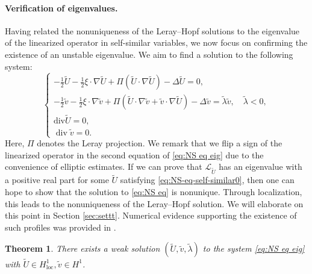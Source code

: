 \documentclass[11pt,a4paper]{article}
\numberwithin{equation}{section}
\newcommand{\cdummy}{\cdot}
\newcommand{\tmop}[1]{\ensuremath{\operatorname{#1}}}
\newtheorem{theorem}{Theorem}
\begin{document}
\paragraph{Verification of eigenvalues.}
Having related the nonuniqueness of the Leray--Hopf solutions to the eigenvalue of the linearized operator in self-similar variables, we now focus on confirming the existence of an unstable eigenvalue. We aim to find a solution to the following system:
\begin{equation}
  \left\{\begin{array}{l}
    - \frac{1}{2}  \widetilde{U} - \frac{1}{2} \xi \cdummy \nabla \widetilde{U} + \Pi
    (\widetilde{U} \cdot \nabla \widetilde{U}) - \Delta \widetilde{U} = 0,\\
    - \frac{1}{2}  \widetilde{v} - \frac{1}{2} \xi \cdummy \nabla \widetilde{v} + \Pi
    (\widetilde{U} \cdot \nabla \widetilde{v} + \widetilde{v} \cdot \nabla \widetilde{U}) -
    \Delta \widetilde{v} = \widetilde\lambda \widetilde{v}, \quad \widetilde\lambda < 0,\\
    \mathrm{div}  \widetilde{U} = 0,\\
    \tmop{div} \widetilde{v} = 0.
  \end{array}\right. \label{eq:NS eq eig}
\end{equation}
Here, $\Pi$ denotes the Leray projection. %
We remark that we flip a sign of the linearized operator in the second equation of \eqref{eq:NS eq eig} due to the convenience of elliptic estimates.
If we can prove that $\mathcal{L}_{\widetilde{U}}$ has an eigenvalue
with a positive real part for some $\widetilde{U}$ satisfying \eqref{eq:NS-eq-self-similar0}, then one can hope to show that the solution to \eqref{eq:NS eq} is nonunique. Through
localization, this leads to the nonuniqueness of the Leray--Hopf solution. We will elaborate on this point in Section \ref{sec:settt}.
Numerical evidence supporting the existence of such profiles was provided in
{\cite{guillod2023numerical}}.
\begin{theorem}
    \label{thm:stationary solu main}
    There
  exists a weak solution $(\widetilde{U},\widetilde{v},\widetilde{\lambda})$ to the system \eqref{eq:NS eq eig} with $\widetilde{U}\in H^1_{\tmop{loc}},\widetilde{v}\in H^1$.
\end{theorem}
\end{document}
